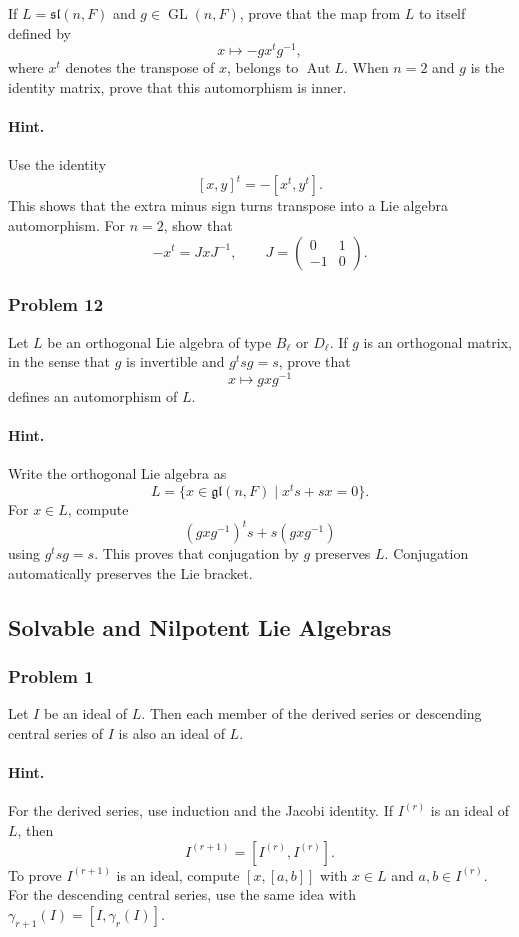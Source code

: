 \documentclass[12pt, a4paper]{article}
\begin{document}
If \(L=\mathfrak{sl}(n,F)\) and \(g \in \operatorname{GL}(n,F)\), prove that the
map from \(L\) to itself defined by
\[
x \longmapsto -g x^t g^{-1},
\]
where \(x^t\) denotes the transpose of \(x\), belongs to \(\operatorname{Aut} L\).
When \(n=2\) and \(g\) is the identity matrix, prove that this automorphism is
inner.

\paragraph{Hint.}
Use the identity
\[
[x,y]^t=-[x^t,y^t].
\]
This shows that the extra minus sign turns transpose into a Lie algebra
automorphism. For \(n=2\), show that
\[
-x^t=JxJ^{-1},
\qquad
J=
\begin{pmatrix}
0&1\\
-1&0
\end{pmatrix}.
\]

\subsubsection{Problem 12}

Let \(L\) be an orthogonal Lie algebra of type \(B_\ell\) or \(D_\ell\). If
\(g\) is an orthogonal matrix, in the sense that \(g\) is invertible and
\(g^t s g=s\), prove that
\[
x \longmapsto gxg^{-1}
\]
defines an automorphism of \(L\).

\paragraph{Hint.}
Write the orthogonal Lie algebra as
\[
L=\{x\in \mathfrak{gl}(n,F)\mid x^t s+sx=0\}.
\]
For \(x\in L\), compute
\[
(gxg^{-1})^t s+s(gxg^{-1})
\]
using \(g^t s g=s\). This proves that conjugation by \(g\) preserves \(L\).
Conjugation automatically preserves the Lie bracket.
\subsection{Solvable and Nilpotent Lie Algebras}

\subsubsection{Problem 1}

Let \(I\) be an ideal of \(L\). Then each member of the derived series or
descending central series of \(I\) is also an ideal of \(L\).

\paragraph{Hint.}
For the derived series, use induction and the Jacobi identity. If \(I^{(r)}\)
is an ideal of \(L\), then
\[
I^{(r+1)}=[I^{(r)},I^{(r)}].
\]
To prove \(I^{(r+1)}\) is an ideal, compute \([x,[a,b]]\) with
\(x\in L\) and \(a,b\in I^{(r)}\). For the descending central series, use the
same idea with \(\gamma_{r+1}(I)=[I,\gamma_r(I)]\).
\end{document}
